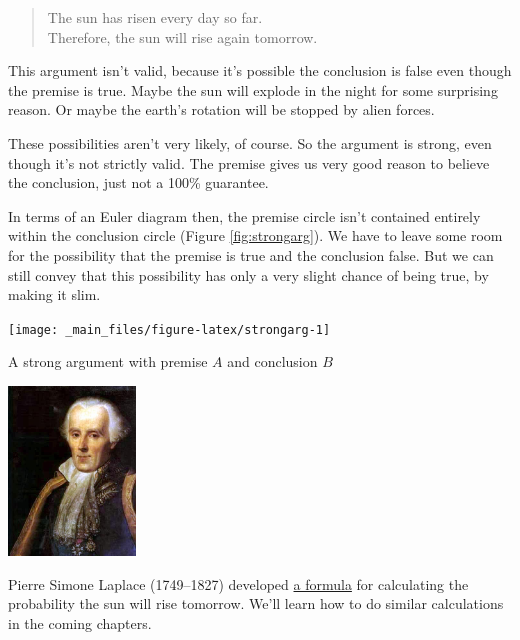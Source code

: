 \documentclass[justified]{tufte-book}
\newenvironment{argument}{\begin{quote}\normalsize}{\end{quote}}
\begin{document}
\begin{argument}
The sun has risen every day so far.\\
Therefore, the sun will rise again tomorrow.
\end{argument}

This argument isn't valid, because it's possible the conclusion is false even though the premise is true. Maybe the sun will explode in the night for some surprising reason. Or maybe the earth's rotation will be stopped by alien forces.

These possibilities aren't very likely, of course. So the argument is strong, even though it's not strictly valid. The premise gives us very good reason to believe the conclusion, just not a 100\% guarantee.

In terms of an Euler diagram then, the premise circle isn't contained entirely within the conclusion circle (Figure \ref{fig:strongarg}). We have to leave some room for the possibility that the premise is true and the conclusion false. But we can still convey that this possibility has only a very slight chance of being true, by making it slim.

\begin{marginfigure}
\texttt{[image: \_main\_files/figure-latex/strongarg-1]} \caption[A strong argument with premise $A$ and conclusion $B$]{A strong argument with premise $A$ and conclusion $B$}\label{fig:strongarg}
\end{marginfigure}



\begin{marginfigure}
\includegraphics[width=1.33in]{img/laplace} \caption[Pierre Simone Laplace (1749--1827) developed \href{https://bit.ly/2mU9WgW}{a formula} for calculating the probability the sun will rise tomorrow. We'll learn how to do similar calculations in the coming chapters.]{Pierre Simone Laplace (1749--1827) developed \href{https://bit.ly/2mU9WgW}{a formula} for calculating the probability the sun will rise tomorrow. We'll learn how to do similar calculations in the coming chapters.}\label{fig:laplace}
\end{marginfigure}
\end{document}
